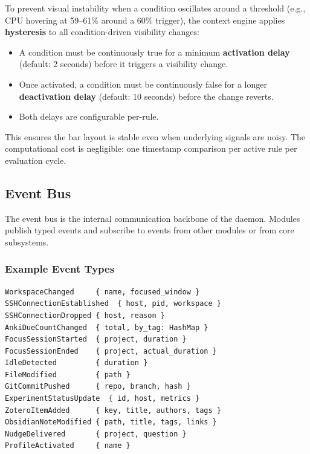 \documentclass[11pt,a4paper]{article}
\begin{document}
To prevent visual instability when a condition oscillates around a threshold (e.g., CPU hovering at 59--61\% around a 60\% trigger), the context engine applies \textbf{hysteresis} to all condition-driven visibility changes:

\begin{itemize}[leftmargin=1.5em, itemsep=2pt]
  \item A condition must be continuously true for a minimum \textbf{activation delay} (default: 2 seconds) before it triggers a visibility change.
  \item Once activated, a condition must be continuously false for a longer \textbf{deactivation delay} (default: 10 seconds) before the change reverts.
  \item Both delays are configurable per-rule.
\end{itemize}

This ensures the bar layout is stable even when underlying signals are noisy. The computational cost is negligible: one timestamp comparison per active rule per evaluation cycle.


\subsection{Event Bus}
\label{sec:event-bus}

The event bus is the internal communication backbone of the daemon. Modules publish typed events and subscribe to events from other modules or from core subsystems.

\subsubsection{Example Event Types}

\begin{lstlisting}[language={}]
WorkspaceChanged     { name, focused_window }
SSHConnectionEstablished  { host, pid, workspace }
SSHConnectionDropped { host, reason }
AnkiDueCountChanged  { total, by_tag: HashMap }
FocusSessionStarted  { project, duration }
FocusSessionEnded    { project, actual_duration }
IdleDetected         { duration }
FileModified         { path }
GitCommitPushed      { repo, branch, hash }
ExperimentStatusUpdate  { id, host, metrics }
ZoteroItemAdded      { key, title, authors, tags }
ObsidianNoteModified { path, title, tags, links }
NudgeDelivered       { project, question }
ProfileActivated     { name }
\end{lstlisting}
\end{document}
